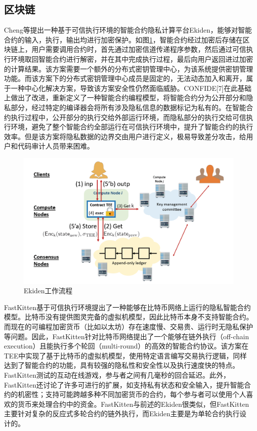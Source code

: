 \documentclass{source/Paper}
\begin{document}
        \subsection{区块链}
        Cheng\cite{cheng2019ekiden}等提出一种基于可信执行环境的智能合约隐私计算平台Ekiden，能够对智能合约的输入，执行，输出均进行加密保护。如图\ref{ekiden}，智能合约经过加密后存储在区块链上，用户需要调用合约时，首先通过加密信道传递程序参数，然后通过可信执行环境取回智能合约进行解密，并在其中完成执行过程，最后向用户返回进过加密的计算结果。该方案需要一个额外的分布式密钥管理中心，为该系统提供密钥管理功能。而该方案下的分布式密钥管理中心成员是固定的，无法动态加入和离开，属于一种中心化解决方案，导致该方案安全性仍然面临威胁。CONFIDE[7]在此基础上做出了改进，重新定义了一种智能合约编程模型，将智能合约分为公开部分和隐私部分，经过特定的编译器会将所有涉及隐私信息的数据标记为私有的。在智能合约执行过程中，公开部分的执行交给外部运行环境，而隐私部分的执行交给可信执行环境，避免了整个智能合约全部运行在可信执行环境中，提升了智能合约的执行效率。但是该方案将隐私数据的边界交由用户进行定义，极易导致差分攻击，给用户和代码审计人员带来困难。

        \begin{figure}[H]
            \centering
            \includegraphics[width=0.7\linewidth]{pic/ekiden.png}
            \caption{Ekiden工作流程}
            \label{ekiden}
        \end{figure}


        FastKitten\cite{das2019fastkitten}基于可信执行环境提出了一种能够在比特币网络上运行的隐私智能合约模型。比特币没有提供图灵完备的虚拟机模型，因此比特币本身不支持智能合约。而现在的可编程加密货币（比如以太坊）存在速度慢、交易贵、运行时无隐私保护等问题。因此，FastKitten针对比特币网络提出了一个能够在链外执行（off-chain execution）且能执行多个轮回（multi-round）的高效的智能合约协议。该方案在TEE中实现了基于比特币的虚拟机模型，使用特定语言编写交易执行逻辑，同样达到了智能合约的功能，具有较强的隐私性和安全性以及执行速度快的特点。FastKitten测试的互动在线游戏，参与者之间有几毫秒的回合延迟。此外，FastKitten还讨论了许多可进行的扩展，如支持私有状态和安全输入，提升智能合约的机密性；支持可能跨越多种不同加密货币的合约，每个参与者可以使用个人喜欢的货币来处理合约中的资金。FastKitten与前述的Ekiden很类似，但FastKitten主要针对复杂的反应式多轮合约的链外执行，而Ekiden主要是为单轮合约执行设计的。
        
\end{document}

